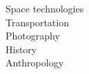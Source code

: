 \documentclass[9pt]{developercv} %
\begin{document}
\begin{minipage}[t]{0.18\textwidth}
		Space technologies\\
		Transportation\\
		Photography\\
		History\\
		Anthropology
\end{minipage}

\end{document}

